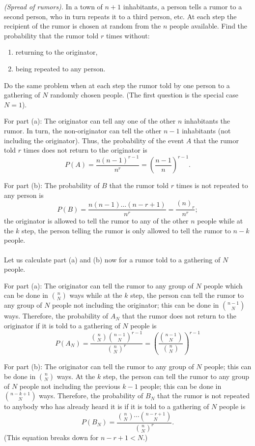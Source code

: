\begin{problem}[Handout 2, \# 13]
  \emph{(Spread of rumors).} In a town of \(n+1\) inhabitants, a person
  tells a rumor to a second person, who in turn repeats it to a third
  person, etc. At each step the recipient of the rumor is chosen at random
  from the \(n\) people available. Find the probability that the rumor told
  \(r\) times without:
  \begin{enumerate}[label=(\alph*),noitemsep]
  \item returning to the originator,
  \item being repeated to any person.
  \end{enumerate}
  Do the same problem when at each step the rumor told by one person to a
  gathering of \(N\) randomly chosen people. (The first question is the
  special case \(N=1\)).
\end{problem}
\begin{solution*}
  For part (a): The originator can tell any one of the other \(n\)
  inhabitants the rumor. In turn, the non-originator can tell the other
  \(n-1\) inhabitants (not including the originator). Thus, the probability
  of the event \(A\) that the rumor told \(r\) times does not return to the
  originator is
  \[
    P(A)=\frac{n(n-1)^{r-1}}{n^r}=\left(\frac{n-1}{n}\right)^{r-1}.
  \]

  For part (b): The probability of \(B\) that the rumor told \(r\) times is
  not repeated to any person is
  \[
    P(B)=\frac{n(n-1)\dotsc(n-r+1)}{n^r}=\frac{(n)_r}{n^r};
  \]
  the originator is allowed to tell the rumor to any of the other \(n\)
  people while at the \(k\) step, the person telling the rumor
  is only allowed to tell the rumor to \(n-k\) people.
  \\\\
  Let us calculate part (a) and (b) now for a rumor told to a gathering of
  \(N\) people.

  For part (a): The originator can tell the rumor to any group of \(N\)
  people which can be done in \(\binom{n}{N}\) ways while at the
  \(k\) step, the person can tell the rumor to any group of
  \(N\) people not including the originator; this can be done in
  \(\binom{n-1}{N}\) ways. Therefore, the probability of \(A_N\) that the
  rumor does not return to the originator if it is told to a gathering of
  \(N\) people is
  \[
    P(A_N)=%
    \frac{\binom{n}{N}\binom{n-1}{N}^{r-1}}{\binom{n}{N}^r}=%
    \left(\frac{\binom{n-1}{N}}{\binom{n}{N}}\right)^{r-1}
  \]

  For part (b): The originator can tell the rumor to any group of \(N\)
  people; this can be done in \(\binom{n}{N}\) ways. At the
  \(k\) step, the person can tell the rumor to any group of
  \(N\) people not including the previous \(k-1\) people; this can be done
  in \(\binom{n-k+1}{N}\) ways. Therefore, the probability of \(B_N\) that
  the rumor is not repeated to anybody who has already heard it is if it is
  told to a gathering of \(N\) people is
  \[
    P(B_N)=\frac{\binom{n}{N}\dotsm\binom{n-r+1}{N}}{\binom{n}{N}^r}.
  \]
  (This equation breaks down for \(n-r+1<N\).)
\end{solution*}

